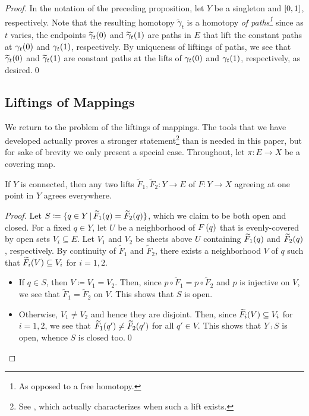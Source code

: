 \documentclass[../Moduli_Spaces_of_Riemann_Surfaces.tex]{subfiles}
\begin{document}
    \begin{proof}
        In the notation of the preceding proposition, let $Y$ be a singleton and $\left[0,1\right]$, respectively. Note that the resulting homotopy $\widetilde{\gamma}_t$ is a homotopy \textit{of paths\footnote{As opposed to a free homotopy.}} since as $t$ varies, the endpoints $\widetilde{\gamma}_t\!\left(0\right)$ and $\widetilde{\gamma}_t\!\left(1\right)$ are paths in $E$ that lift the constant paths at $\gamma_t\!\left(0\right)$ and $\gamma_t\!\left(1\right)$, respectively. By uniqueness of liftings of paths, we see that $\widetilde{\gamma}_t\!\left(0\right)$ and $\widetilde{\gamma}_t\!\left(1\right)$ are constant paths at the lifts of $\gamma_t\!\left(0\right)$ and $\gamma_t\!\left(1\right)$, respectively, as desired.\qed
    \end{proof}
    \subsection{Liftings of Mappings}
    We return to the problem of the liftings of mappings. The tools that we have developed actually proves a stronger statement\footnote{See \cite[][Proposition 1.33]{hatcher}, which actually characterizes when such a lift exists.} than is needed in this paper, but for sake of brevity we only present a special case. Throughout, let $\pi:E\to X$ be a covering map.
    \begin{lemma}
        If $Y$ is connected, then any two lifts $\widetilde{F}_1,\widetilde{F}_2:Y\to E$ of $F:Y\to X$ agreeing at one point in $Y$ agrees everywhere.
    \end{lemma}
    \begin{proof}
        Let $S\coloneqq\{q\in Y\,|\,\widetilde{F}_1\!\left(q\right)=\widetilde{F}_2\!\left(q\right)\}$, which we claim to be both open and closed. For a fixed $q\in Y$, let $U$ be a neighborhood of $F\left(q\right)$ that is evenly-covered by open sets $V_i\subseteq E$. Let $V_1$ and $V_2$ be sheets above $U$ containing $\widetilde{F}_1\!\left(q\right)$ and $\widetilde{F}_2\!\left(q\right)$, respectively. By continuity of $\widetilde{F}_1$ and $\widetilde{F}_2$, there exists a neighborhood $V$ of $q$ such that $\widetilde{F}_i\!\left(V\right)\subseteq V_i$ for $i=1,2$.
        \begin{itemize}
            \item If $q\in S$, then $V\coloneqq V_1=V_2$. Then, since $p\circ\widetilde{F}_1=p\circ\widetilde{F}_2$ and $p$ is injective on $V$, we see that $\widetilde{F}_1=\widetilde{F}_2$ on $V$. This shows that $S$ is open.
                \vspace{-0.05in}
            \item Otherwise, $V_1\neq V_2$ and hence they are disjoint. Then, since $\widetilde{F}_i\!\left(V\right)\subseteq V_i$ for $i=1,2$, we see that $\widetilde{F}_1\!\left(q'\right)\neq\widetilde{F}_2\!\left(q'\right)$ for all $q'\in V$. This shows that $Y\comp S$ is open, whence $S$ is closed too.\qed
        \end{itemize}
    \end{proof}
\end{document}
